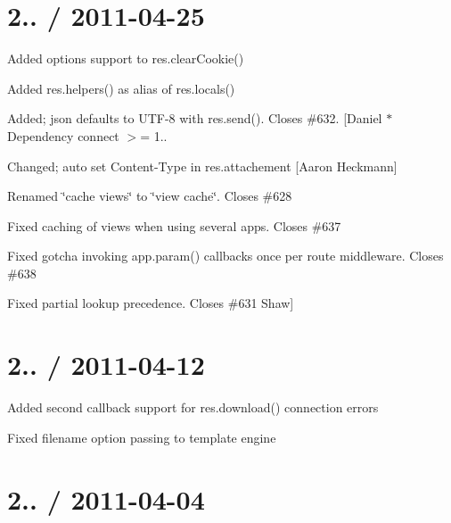 {\ttfamily \section*{2.. / 2011-\/04-\/25 }}

{\ttfamily }

{\ttfamily 
\begin{DoxyItemize}
\item Added options support to {\ttfamily res.\+clear\+Cookie()}
\item Added {\ttfamily res.\+helpers()} as alias of {\ttfamily res.\+locals()}
\item Added; json defaults to U\+T\+F-\/8 with {\ttfamily res.\+send()}. Closes \#632. \mbox{[}Daniel $\ast$ Dependency {\ttfamily connect $>$= 1..}
\item Changed; auto set Content-\/\+Type in res.\+attachement \mbox{[}Aaron Heckmann\mbox{]}
\item Renamed \char`\"{}cache views\char`\"{} to \char`\"{}view cache\char`\"{}. Closes \#628
\item Fixed caching of views when using several apps. Closes \#637
\item Fixed gotcha invoking {\ttfamily app.\+param()} callbacks once per route middleware. Closes \#638
\item Fixed partial lookup precedence. Closes \#631 Shaw\mbox{]}
\end{DoxyItemize}}

{\ttfamily \section*{2.. / 2011-\/04-\/12 }}

{\ttfamily }

{\ttfamily 
\begin{DoxyItemize}
\item Added second callback support for {\ttfamily res.\+download()} connection errors
\item Fixed {\ttfamily filename} option passing to template engine
\end{DoxyItemize}}

{\ttfamily \section*{2.. / 2011-\/04-\/04 }}

{\ttfamily }


